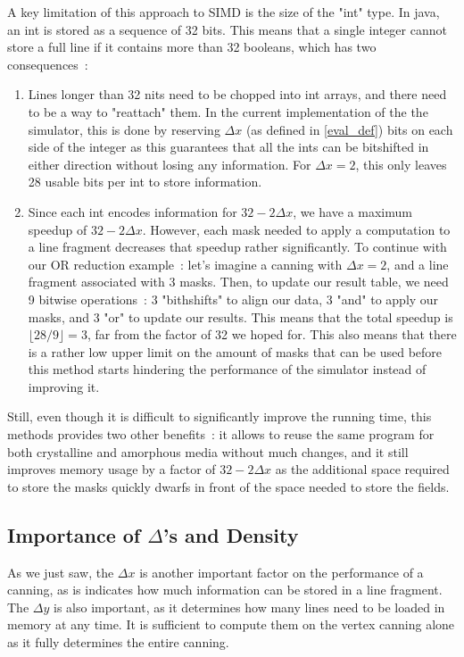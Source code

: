 \documentclass{report}
\begin{document}
A key limitation of this approach to SIMD is the size of the "int" type. In java, an int is stored as a sequence of 32 bits. This means that a single integer cannot store a full line if it contains more than 32 booleans, which has two consequences~:
\begin{enumerate}
	\item Lines longer than 32 nits need to be chopped into int arrays, and there need to be a way to "reattach" them. In the current implementation of the the simulator, this is done by reserving $\Delta x$ (as defined in \ref{eval_def}) bits on each side of the integer as this guarantees that all the ints can be bitshifted in either direction without losing any information.
	For $\Delta x = 2$, this only leaves 28 usable bits per int to store information.
	
	\item Since each int encodes information for $32 - 2\Delta x$, we have a maximum speedup of $32 - 2\Delta x$. However, each mask needed to apply a computation to a line fragment decreases that speedup rather significantly. To continue with our OR reduction example~: let's imagine a canning with $\Delta x = 2$, and a line fragment associated with 3 masks. Then, to update our result table, we need 9 bitwise operations~: 3 "bithshifts" to align our data, 3 "and" to apply our masks, and 3 "or" to update our results. This means that the total speedup is $\lfloor 28/9\rfloor = 3$, far from the factor of 32 we hoped for. This also means that there is a rather low upper limit on the amount of masks that can be used before this method starts hindering the performance of the simulator instead of improving it.
\end{enumerate}

Still, even though it is difficult to significantly improve the running time, this methods provides two other benefits~: it allows to reuse the same program for both crystalline and amorphous media without much changes, and it still improves memory usage by a factor of $32 - 2\Delta x$ as the additional space required to store the masks quickly dwarfs in front of the space needed to store the fields.

\subsection{Importance of $\Delta$'s and Density}

As we just saw, the $\Delta x$ is another important factor on the performance of a canning, as is indicates how much information can be stored in a line fragment. The $\Delta y$ is also important, as it determines how many lines need to be loaded in memory at any time. It is sufficient to compute them on the vertex canning alone as it fully determines the entire canning.\\
\end{document}
